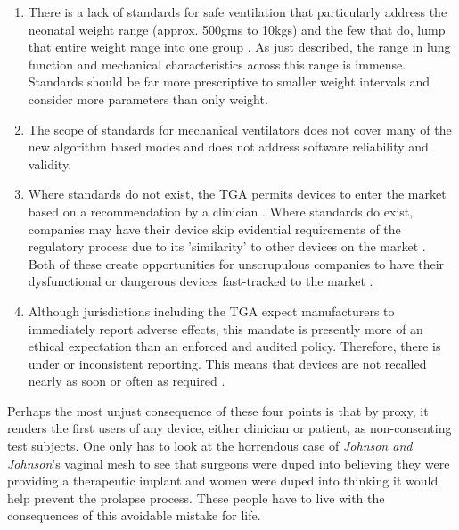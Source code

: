 \documentclass[12pt, openany, oneside]{book}
\begin{document}
\begin{enumerate}

\item There is a lack of standards for safe ventilation that particularly address the neonatal weight range  (approx. 500gms to 10kgs) and the few that do, lump that entire weight range into one group \citep{muzza}. As just described, the range in lung function and mechanical characteristics across this range is immense. Standards should be far more prescriptive to smaller weight intervals and consider more parameters than only weight.
\item The scope of standards for mechanical ventilators does not cover many of the new algorithm based modes \citep{muzza} and does not address software reliability and validity.
\item Where standards do not exist, the TGA permits devices to enter the market based on a recommendation by a clinician \citep{tga}. Where standards do exist, companies may have their device skip evidential requirements of the regulatory process due to its 'similarity' to other devices on the market \citep{tga, walker2017ethics}. Both of these create opportunities for unscrupulous companies to have their dysfunctional or dangerous devices fast-tracked to the market \citep{walker2017ethics}. 
\item Although jurisdictions including the TGA expect manufacturers to immediately report adverse effects, this mandate is presently more of an ethical expectation than an enforced and audited policy. Therefore, there is under or inconsistent reporting. This means that devices are not recalled nearly as soon or often as required \citep{walker2017ethics}. 
\end{enumerate} 

Perhaps the most unjust consequence of these four points is that by proxy, it renders the first users of any device, either clinician or patient, as non-consenting test subjects. One only has to look at the horrendous case of \textit{Johnson and Johnson}'s vaginal mesh to see that surgeons were duped into believing they were providing a therapeutic implant and women were duped into thinking it would help prevent the prolapse process. These people have to live with the consequences of this avoidable mistake for life. \\
\end{document}
